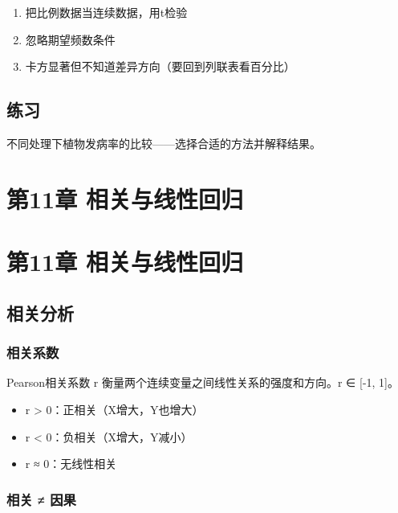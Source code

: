 \documentclass[
  letterpaper,
]{scrbook}
\providecommand{\tightlist}{%
  \setlength{\itemsep}{0pt}\setlength{\parskip}{0pt}}
\begin{document}
\begin{enumerate}
\def\labelenumi{\arabic{enumi}.}
\tightlist
\item
  把比例数据当连续数据，用t检验
\item
  忽略期望频数条件
\item
  卡方显著但不知道差异方向（要回到列联表看百分比）
\end{enumerate}

\section{练习}\label{ux7ec3ux4e60-9}

不同处理下植物发病率的比较------选择合适的方法并解释结果。

\chapter{第11章
相关与线性回归}\label{ux7b2c11ux7ae0-ux76f8ux5173ux4e0eux7ebfux6027ux56deux5f52}

\chapter{第11章
相关与线性回归}\label{ux7b2c11ux7ae0-ux76f8ux5173ux4e0eux7ebfux6027ux56deux5f52-1}

\section{相关分析}\label{ux76f8ux5173ux5206ux6790}

\subsection{相关系数}\label{ux76f8ux5173ux7cfbux6570}

Pearson相关系数 r 衡量两个连续变量之间线性关系的强度和方向。r ∈ {[}-1,
1{]}。

\begin{itemize}
\tightlist
\item
  r \textgreater{} 0：正相关（X增大，Y也增大）
\item
  r \textless{} 0：负相关（X增大，Y减小）
\item
  r ≈ 0：无线性相关
\end{itemize}

\subsection{相关 ≠ 因果}\label{ux76f8ux5173-ux56e0ux679c}
\end{document}
